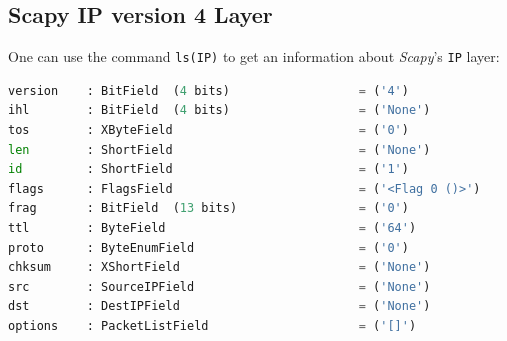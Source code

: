 \subsection{Scapy IP version 4 Layer}
\label{apx:ipv4}

One can use the command \lstinline{ls(IP)} to get an information about \textit{Scapy}'s \cite{scapy2024} \lstinline{IP} layer:

\begin{lstlisting}[language=python, caption=Scapy IPv4 Layer]
version    : BitField  (4 bits)                  = ('4')
ihl        : BitField  (4 bits)                  = ('None')
tos        : XByteField                          = ('0')
len        : ShortField                          = ('None')
id         : ShortField                          = ('1')
flags      : FlagsField                          = ('<Flag 0 ()>')
frag       : BitField  (13 bits)                 = ('0')
ttl        : ByteField                           = ('64')
proto      : ByteEnumField                       = ('0')
chksum     : XShortField                         = ('None')
src        : SourceIPField                       = ('None')
dst        : DestIPField                         = ('None')
options    : PacketListField                     = ('[]')
\end{lstlisting}
